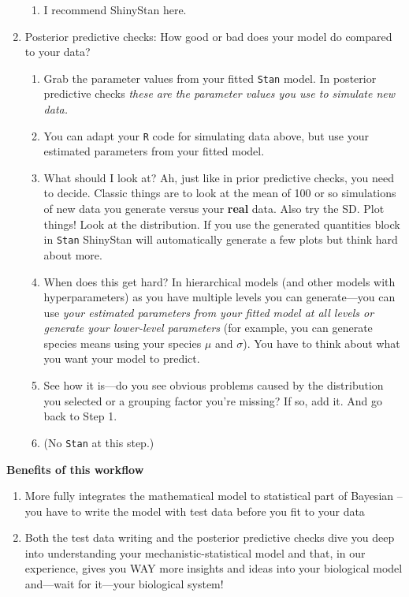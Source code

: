\documentclass[11pt]{article}
\begin{document}
\begin{enumerate}
\begin{enumerate}
\item I recommend ShinyStan here.
\end{enumerate}
\item Posterior predictive checks: How good or bad does your model do compared to your data?
\begin{enumerate}
\item Grab the parameter values from your fitted \verb|Stan| model. In posterior predictive checks \emph{these are the parameter values you use to simulate new data.}  
\item You can adapt your \verb|R| code for simulating data above, but use your estimated parameters from your fitted model. 
\item What should I look at? Ah, just like in prior predictive checks, you need to decide. Classic things are to look at the mean of 100 or so simulations of new data you generate versus your {\bf real} data. Also try the SD. Plot things! Look at the distribution. If you use the generated quantities block in \verb|Stan| ShinyStan will automatically generate a few plots but think hard about more.
\item When does this get hard? In hierarchical models (and other models with hyperparameters) as you have multiple levels you can generate---you can use \emph{your estimated parameters from your fitted model at all levels or generate your lower-level parameters} (for example, you can generate species means using your species $\mu$ and $\sigma$). You have to think about what you want your model to predict.
\item See how it is---do you see obvious problems caused by the distribution you selected or a grouping factor you're missing? If so, add it. And go back to Step 1. 
\item (No \verb|Stan| at this step.)
\end{enumerate}
\end{enumerate}

{\bf Benefits of this workflow}

\begin{enumerate}
\item More fully integrates the mathematical model to statistical part of Bayesian -- you have to write the model with test data before you fit to your data
\item Both the test data writing and the posterior predictive checks dive you deep into understanding your mechanistic-statistical model and that, in our experience, gives you WAY more insights and ideas into your biological model and---wait for it---your biological system!
\end{enumerate}
\end{document}

